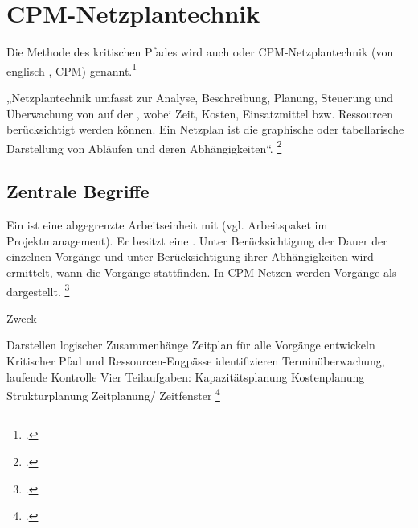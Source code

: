 \documentclass{lehramt-informatik-haupt}
\begin{document}

\chapter{CPM-Netzplantechnik}

\begin{quellen}
\item \cite{wiki:netzplantechnik}
\item \cite{wiki:methode-kritischer-pfad}
\end{quellen}

\noindent
Die Methode des kritischen Pfades wird auch
 oder CPM-Netzplantechnik (von
englisch , CPM)
genannt.\footcite{wiki:methode-kritischer-pfad}

„Netzplantechnik umfasst  zur Analyse,
Beschreibung, Planung, Steuerung und Überwachung von 
auf der , wobei Zeit, Kosten,
Einsatzmittel bzw. Ressourcen berücksichtigt werden können. Ein Netzplan
ist die graphische oder tabellarische Darstellung von Abläufen und deren
Abhängigkeiten“.
\footcite[Seite 14]{sosy:fs:3}

%

\section{Zentrale Begriffe}

Ein  ist eine abgegrenzte Arbeitseinheit mit
 (vgl. Arbeitspaket im Projektmanagement).
Er besitzt eine .
%
Unter Berücksichtigung der Dauer der einzelnen Vorgänge und unter
Berücksichtigung ihrer Abhängigkeiten wird ermittelt, wann die Vorgänge
stattfinden.
%
In CPM Netzen werden Vorgänge als 
dargestellt.
\footcite[Seite 15]{sosy:fs:3}

Zweck

Darstellen logischer Zusammenhänge
Zeitplan für alle Vorgänge entwickeln
Kritischer Pfad und Ressourcen-Engpässe identifizieren
Terminüberwachung, laufende Kontrolle
Vier Teilaufgaben:
Kapazitätsplanung
Kostenplanung
Strukturplanung
Zeitplanung/ Zeitfenster
\footcite[Seite 22]{sosy:fs:3}
\end{document}
